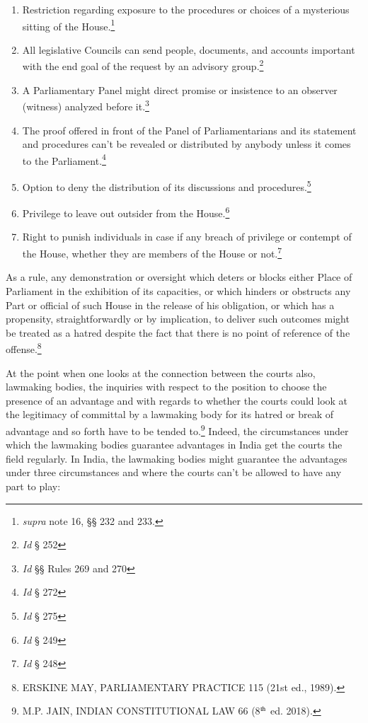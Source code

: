 \begin{multicols}{2}
\begin{enumerate}[label=$\bullet$]
\item Restriction regarding exposure to the procedures or choices of a mysterious
sitting of the House.\footnote{\textit{supra} note 16, §§ 232 and 233.}

\item All legislative Councils can send people, documents, and accounts important
with the end goal of the request by an advisory group.\footnote{\textit{Id} § 252}

\item A Parliamentary Panel might direct promise or insistence to an observer
(witness) analyzed before it.\footnote{\textit{Id} §§ Rules 269 and 270}

\item The proof offered in front of the Panel of Parliamentarians and its statement
and procedures can't be revealed or distributed by anybody unless it comes to
the Parliament.\footnote{\textit{Id} § 272}

\item Option to deny the distribution of its discussions and procedures.\footnote{\textit{Id} § 275}

\item Privilege to leave out outsider from the House.\footnote{\textit{Id} § 249}

\item Right to punish individuals in case if any breach of privilege or contempt of the House, whether they are members of the House or not.\footnote{\textit{Id} § 248}
\end{enumerate}


\noi
As a rule, any demonstration or oversight which deters or blocks either Place of Parliament in
the exhibition of its capacities, or which hinders or obstructs any Part or official of such
House in the release of his obligation, or which has a propensity, straightforwardly or by
implication, to deliver such outcomes might be treated as a hatred despite the fact that there is
no point of reference of the offense.\footnote{ERSKINE MAY, PARLIAMENTARY PRACTICE 115 (21st ed., 1989).}

\noi
At the point when one looks at the connection between the courts also, lawmaking bodies, the
inquiries with respect to the position to choose the presence of an advantage and with regards
to whether the courts could look at the legitimacy of committal by a lawmaking body for its
hatred or break of advantage and so forth have to be tended to.\footnote{M.P. JAIN, INDIAN CONSTITUTIONAL LAW 66 (8$^{\rm th}$ ed. 2018).} Indeed, the circumstances under which the lawmaking bodies guarantee advantages in India get the courts the field regularly. In India, the lawmaking bodies might guarantee the advantages under three
circumstances and where the courts can’t be allowed to have any part to play:


\end{multicols}
